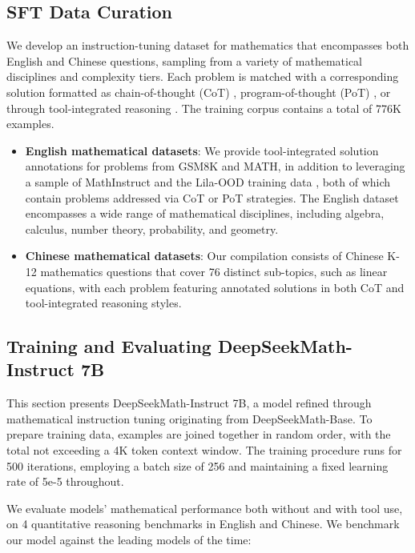 \begin{itemize}[topsep=0pt]
\subsection{SFT Data Curation}

We develop an instruction-tuning dataset for mathematics that encompasses both English and Chinese questions, sampling from a variety of mathematical disciplines and complexity tiers. Each problem is matched with a corresponding solution formatted as chain-of-thought (CoT) \citep{cot}, program-of-thought (PoT) \citep{pot,pal}, or through tool-integrated reasoning \citep{tora}. The training corpus contains a total of 776K examples.

\begin{itemize}[topsep=0pt]
    \item \textbf{English mathematical datasets}: We provide tool-integrated solution annotations for problems from GSM8K and MATH, in addition to leveraging a sample of MathInstruct \citep{MathInstruct} and the Lila-OOD training data \citep{lila}, both of which contain problems addressed via CoT or PoT strategies. The English dataset encompasses a wide range of mathematical disciplines, including algebra, calculus, number theory, probability, and geometry.
    \item \textbf{Chinese mathematical datasets}: Our compilation consists of Chinese K-12 mathematics questions that cover 76 distinct sub-topics, such as linear equations, with each problem featuring annotated solutions in both CoT and tool-integrated reasoning styles.
\end{itemize}

\subsection{Training and Evaluating DeepSeekMath-Instruct 7B}

This section presents DeepSeekMath-Instruct 7B, a model refined through mathematical instruction tuning originating from DeepSeekMath-Base. To prepare training data, examples are joined together in random order, with the total not exceeding a 4K token context window. The training procedure runs for 500 iterations, employing a batch size of 256 and maintaining a fixed learning rate of 5e-5 throughout.

We evaluate models' mathematical performance both without and with tool use, on 4 quantitative reasoning benchmarks in English and Chinese. We benchmark our model against the leading models of the time:


\end{itemize}
